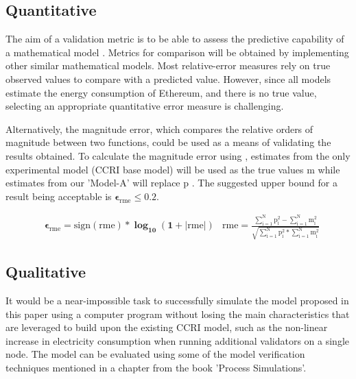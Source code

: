 \subsection{Quantitative}
\label{MethoologyErrorQuant}
The aim of a validation metric is to be able to assess the predictive capability of a mathematical model \cite{Kat2012ValidationError}. Metrics for comparison will be obtained by implementing other similar mathematical models. Most relative-error measures rely on true observed values to compare with a predicted value. However, since all models estimate the energy consumption of Ethereum, and there is no true value, selecting an appropriate quantitative error measure is challenging. 

Alternatively, the magnitude error, which compares the relative orders of magnitude between two functions, could be used as a means of validating the results obtained. To calculate the magnitude error using , estimates from the only experimental model (CCRI base model) will be used as the true values $\boldsymbol{\mathrm{m}}$ while estimates from our 'Model-A' will replace $\boldsymbol{\mathrm{p}}$ \cite{RussellErrorMeasure}. The suggested upper bound for a result being acceptable is $\boldsymbol{\epsilon_\mathrm{rme} \leq 0.2}$.

\begin{align}
\label{eqn:ErrorMeasureEqn}
    &\boldsymbol{\epsilon_\mathrm{rme} = \mathrm{sign(rme)} * \log_{10} (1 + |\mathrm{rme}|)}
    &\boldsymbol{ \mathrm{rme} = \mathrm{\frac{\mathrm{\sum\limits_{i=1}^{N} p_{i}^{2}} - \mathrm{\sum\limits_{i=1}^{N} m_{i}^{2}}}{\sqrt{\mathrm{\sum\limits_{i=1}^{N} p_{i}^{2}} * \mathrm{\sum\limits_{i=1}^{N} m_{i}^{2}}}}}}
\end{align}

\subsection{Qualitative}
\label{QualModelEvalMEthodology}
 It would be a near-impossible task to successfully simulate the model proposed in this paper using a computer program without losing the main characteristics that are leveraged to build upon the existing CCRI model, such as the non-linear increase in electricity consumption when running additional validators on a single node. The model can be evaluated using some of the model verification techniques mentioned in a chapter \cite{Al-Aomar2015ModelTechniques} from the book 'Process Simulations'.

